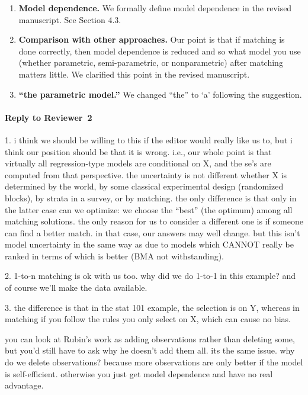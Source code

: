 \documentclass[11pt]{article}
\begin{document}
\begin{enumerate}
\item {\bf Model dependence.} We formally define model dependence in
  the revised manuscript. See Section 4.3.

\item {\bf Comparison with other approaches.} Our point is that if
  matching is done correctly, then model dependence is reduced and so
  what model you use (whether parametric, semi-parametric, or
  nonparametric) after matching matters little. We clarified this
  point in the revised manuscript.


\item {\bf ``the parametric model.''} We changed ``the'' to `a'
  following the suggestion.
\end{enumerate}


\paragraph{Reply to Reviewer~2}

1. i think we should be willing to this if the editor would really
like us to, but i think our position should be that it is wrong.
i.e., our whole point is that virtually all regression-type models are
conditional on X, and the se's are computed from that perspective.
the uncertainty is not different whether X is determined by the world,
by some classical experimental design (randomized blocks), by strata
in a survey, or by matching.  the only difference is that only in the
latter case can we optimize: we choose the ``best'' (the optimum)
among all matching solutions.  the only reason for us to consider a
different one is if someone can find a better match.  in that case,
our answers may well change.  but this isn't model uncertainty in the
same way as due to models which CANNOT really be ranked in terms of
which is better (BMA not withstanding).

2. 1-to-n matching is ok with us too.  why did we do 1-to-1 in this
example?  and of course we'll make the data available.

3.  the difference is that in the stat 101 example, the selection is
on Y, whereas in matching if you follow the rules you only select on
X, which can cause no bias.

you can look at Rubin's work as adding observations rather than
deleting some, but you'd still have to ask why he doesn't add them
all.  its the same issue.  why do we delete observations?  because
more observations are only better if the model is self-efficient.
otherwise you just get model dependence and have no real advantage.
\end{document}
